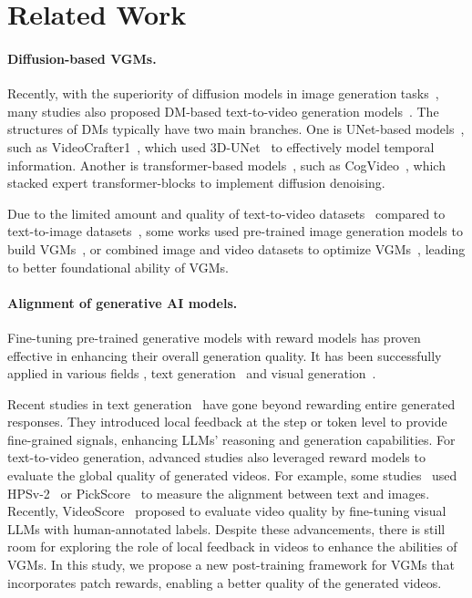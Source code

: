 \section{Related Work}\label{{sec:related}}
\paragraph{Diffusion-based VGMs.}
Recently, with the superiority of diffusion models in image generation tasks~\cite{DM1,DM2,DDIM,SDXL,LatentDM}, many studies also proposed DM-based text-to-video generation models~\cite{VDM,LAVIE,Text2Video-Zero,VC2,CogVideoX,ModelScope}. 
The structures of DMs typically have two main branches. One is UNet-based models~\cite{UNet,VC2,ModelScope}, such as VideoCrafter1~\cite{VC1}, which used 3D-UNet~\cite{3DUNet} to effectively model temporal information. Another is transformer-based models~\cite{DiT,EasyAnimate-DiT,CogVideo,CogVideoX}, such as CogVideo~\cite{CogVideo,CogVideoX}, which stacked expert transformer-blocks to implement diffusion denoising. 

Due to the limited amount and quality of text-to-video datasets~\cite{webvid-1m,OpenVid-1M,UCF101} compared to text-to-image datasets~\cite{LAION-5B}, some works used pre-trained image generation models to build VGMs~\cite{show-1,AlignLatent,Text2Video-Zero}, or combined image and video datasets to optimize VGMs~\cite{VC1,VC2}, leading to better foundational ability of VGMs.

\paragraph{Alignment of generative AI models.}
Fine-tuning pre-trained generative models with reward models has proven effective in enhancing their overall generation quality. 
It has been successfully applied in various fields \eg, text generation~\cite{LMFI,GPT-3.5,GPT-4,richrag} and visual generation~\cite{AlignDM,DRaFT,DPOK,DMDPO,RLDMDiverse,t2v-turbo,t2v-turbo-v2,InstructVideo}. 

Recent studies in text generation~\cite{TLCR,Step-DPO} have gone beyond rewarding entire generated responses. They introduced local feedback at the step or token level to provide fine-grained signals, enhancing LLMs' reasoning and generation capabilities. 
For text-to-video generation, advanced studies also leveraged reward models to evaluate the global quality of generated videos. For example, some studies~\cite{DRaFT,DDPO,DPOK,t2v-turbo,InstructVideo} used HPSv-2~\cite{HPSv2} or PickScore~\cite{PickScore} to measure the alignment between text and images. Recently, VideoScore~\cite{VideoScore} proposed to evaluate video quality by fine-tuning visual LLMs with human-annotated labels. 
Despite these advancements, there is still room for exploring the role of local feedback in videos to enhance the abilities of VGMs. In this study, we propose a new post-training framework for VGMs that incorporates patch rewards, enabling a better quality of the generated videos.